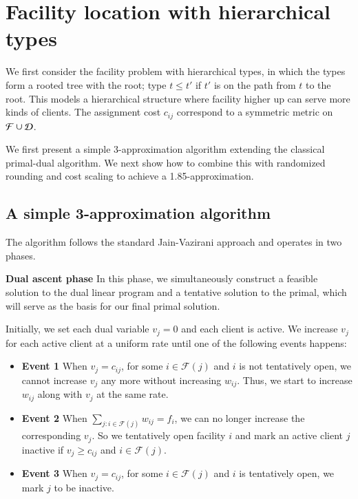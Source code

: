\section{Facility location with hierarchical types}

We first consider the facility problem with hierarchical types, in which the types form a rooted tree with the root; type $t \le t'$ if $t'$ is on the path from $t$ to the root. This models a hierarchical structure where facility higher up can serve more kinds of clients. The assignment cost $c_{ij}$ correspond to a symmetric metric on $\cal{F} \cup \cal{D}$.

We first present a simple 3-approximation algorithm extending the classical primal-dual
algorithm. We next show how to combine this with randomized rounding and cost scaling to
achieve a 1.85-approximation. %

\subsection{A simple 3-approximation algorithm}

The algorithm follows the standard Jain-Vazirani \cite{jain2001approximation} approach and operates in two phases.

\textbf{Dual ascent phase}
In this phase, we simultaneously construct a feasible solution to the dual linear program and a tentative solution to the primal, which will serve as the basis for our final primal solution.

Initially, we set each dual variable $v_j = 0$ and each client is active. We increase $v_j$ for each active client at a uniform rate until one of the following events happens:

\begin{itemize}
\item \textbf{Event 1} When $v_j = c_{ij}$, for some $i \in \mathcal{F}(j)$ and $i$ is not tentatively open,
we cannot increase $v_j$ any more without increasing $w_{ij}$.
Thus, we start to increase $w_{ij}$ along with $v_j$ at the same rate.

\item \textbf{Event 2} When $\sum_{j: i \in \mathcal{F}(j)} w_{ij} = f_i$, we can no longer increase the corresponding $v_j$.
So we tentatively open facility $i$ and mark an active client $j$ inactive if $v_j \ge c_{ij}$ and $i \in \mathcal{F}(j)$.

\item \textbf{Event 3} When $v_j = c_{ij}$, for some $i \in \mathcal{F}(j)$ and $i$ is tentatively open,
we mark $j$ to be inactive.
\end{itemize}

